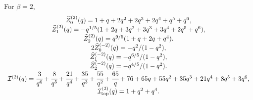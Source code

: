 \documentclass[hyper,letterpaper]{JHEP3}
\renewcommand{\hat}{\widehat}
\def\CI{{\mathcal I}}
\begin{document}
For $\beta=2$,
\begin{equation}
	\begin{array}{c}

	 	\hat{Z}_0^{(2)}(q)=1+q+2q^2+2q^3+2q^4+q^5+q^6,\\	
	 	\hat{Z}_1^{(2)}(q)=-q^{1/5}(1+2q+3q^2+3q^3+3q^4+2q^5+q^6),\\
	 	\hat{Z}_2^{(2)}(q)=q^{9/5}(1+q+2q+q^4).
	 	 \\
	2\hat{Z}_0^{(-2)}(q)=-q^2/(1-q^2),\\	
	\hat{Z}_1^{(-2)}(q)=-q^{6/5}/(1-q^2),\\
	\hat{Z}_2^{(-2)}(q)=-q^{4/5}/(1-q^2).
	 \\
	 \CI^{(2)}(q)=\cfrac{3}{q^6}+\cfrac{8}{q^5}+\cfrac{21}{q^4}
	 +\cfrac{35}{q^3}+\cfrac{55}{q^2}+\cfrac{65}{q}+76+65q+55q^2+35q^3+21q^4+8q^5+3q^6,
	\\
\CI^{(2)}_\text{top}(q)=1+q^2+q^4.
	\end{array}
\end{equation}
\end{document}
